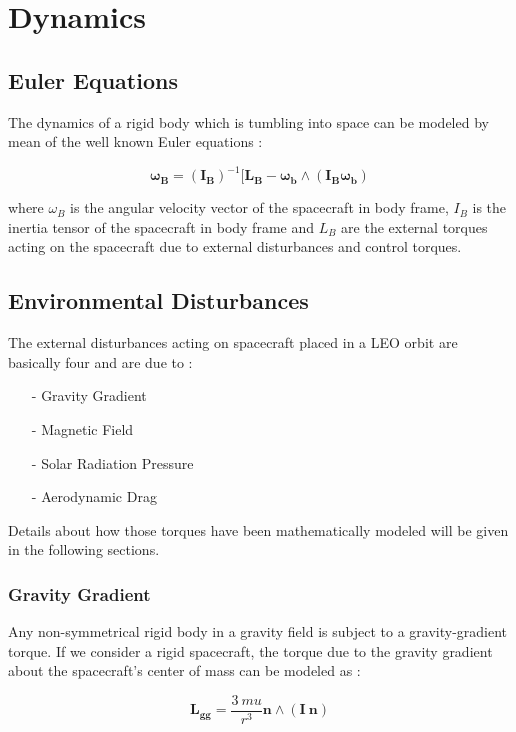 \section{Dynamics}
\subsection{Euler Equations}
The dynamics of a rigid body which is tumbling into space can be modeled by mean of the well known Euler equations : 

\begin{equation}
  \mathbf{\omega_B} = \mathbf{(I_B)}^{-1} [\mathbf{L_B} - \mathbf{\omega_b}  \wedge (\mathbf{I_B} \mathbf{\omega_b})
\end{equation}

where \textbf{$\omega_B$} is the angular velocity vector of the spacecraft in body frame, \textbf{$I_B$} is the inertia tensor of the spacecraft in body frame and \textbf{$L_B$} are the external torques acting on the spacecraft due to  external disturbances and control torques.

\subsection{Environmental Disturbances} \label{sec:disturbances}
The external disturbances acting on spacecraft placed in a LEO orbit are basically four and are due to :

\begin{itemize}
  \item[-] Gravity Gradient
  \item[-] Magnetic Field 
  \item[-] Solar Radiation Pressure
  \item[-] Aerodynamic Drag
\end{itemize}

Details about how those torques have been mathematically modeled will be given in the following sections.

\subsubsection{Gravity Gradient}
Any non-symmetrical rigid body in a gravity field is subject to a gravity-gradient torque.
If we consider a rigid spacecraft, the torque due to the gravity gradient about the spacecraft's center of mass can be modeled as :

\begin{equation}
 \mathbf{L_{gg}} = \frac{3 \ mu}{r^3} \mathbf{n} \wedge (\mathbf{I} \ \mathbf{n})
\end{equation}

